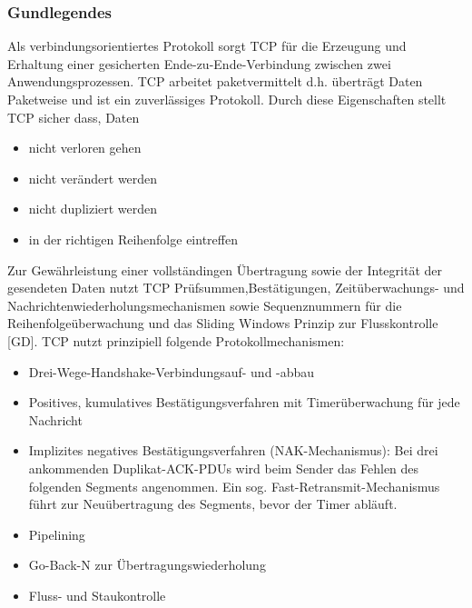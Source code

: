 \subsubsection{Gundlegendes}
Als verbindungsorientiertes Protokoll sorgt TCP für die Erzeugung und Erhaltung einer gesicherten 
Ende-zu-Ende-Verbindung zwischen zwei Anwendungsprozessen. TCP arbeitet paketvermittelt d.h. überträgt Daten Paketweise und ist ein zuverlässiges Protokoll.
Durch diese Eigenschaften stellt TCP sicher dass, Daten
\begin{itemize}
	\item{nicht verloren gehen}
	\item{nicht verändert werden}
	\item{nicht dupliziert werden}
	\item{in der richtigen Reihenfolge eintreffen}
\end{itemize}
Zur Gewährleistung einer vollständingen Übertragung sowie der Integrität der gesendeten Daten nutzt TCP Prüfsummen,Bestätigungen, Zeitüberwachungs- und Nachrichtenwiederholungsmechanismen sowie Sequenznummern für die Reihenfolgeüberwachung und das Sliding Windows Prinzip zur Flusskontrolle [GD].
\newline
TCP nutzt prinzipiell folgende Protokollmechanismen:
\begin{itemize}
	\item{Drei-Wege-Handshake-Verbindungsauf- und -abbau}
	\item{Positives, kumulatives Bestätigungsverfahren mit Timerüberwachung für jede Nachricht}
	\item{Implizites negatives Bestätigungsverfahren (NAK-Mechanismus): Bei drei ankommenden Duplikat-ACK-PDUs wird beim Sender das Fehlen des folgenden Segments angenommen. Ein sog. Fast-Retransmit-Mechanismus führt zur Neuübertragung des Segments, bevor der Timer abläuft.}
	\item{Pipelining}
	\item{Go-Back-N zur Übertragungswiederholung}
	\item{Fluss- und Staukontrolle}
\end{itemize}

